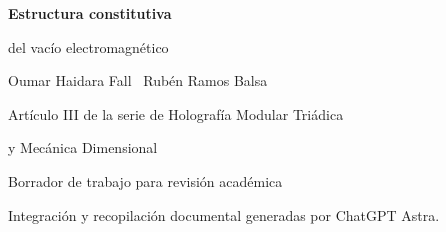 \documentclass[a4paper,10pt]{article}
\newcommand{\Autores}{Oumar Haidara Fall \textperiodcentered\ Rubén Ramos Balsa}
\theoremstyle{definition}\newtheorem{definition}[theorem]{Definición}\newtheorem{axiom}[theorem]{Axioma}
\theoremstyle{remark}\newtheorem{remark}[theorem]{Observación}
\numberwithin{equation}{section}
\renewcommand{\normalsize}{\fontsize{10.5}{13.4}\selectfont}\normalsize
\begin{document}
\begin{titlepage}
\centering\vspace*{28mm}
{\fontsize{23}{28}\selectfont\bfseries Estructura constitutiva\par del vacío electromagnético\par}
\vspace{12mm}
{\large\Autores\par}
\vspace{12mm}
{\normalsize Artículo III de la serie de Holografía Modular Triádica\par y Mecánica Dimensional\par}
\vfill
{\normalsize Borrador de trabajo para revisión académica\par}
\vspace{4mm}
{\small Integración y recopilación documental generadas por ChatGPT Astra.\par}
\vspace{18mm}
\end{titlepage}


\clearpage\tableofcontents











\appendix



\end{document}
